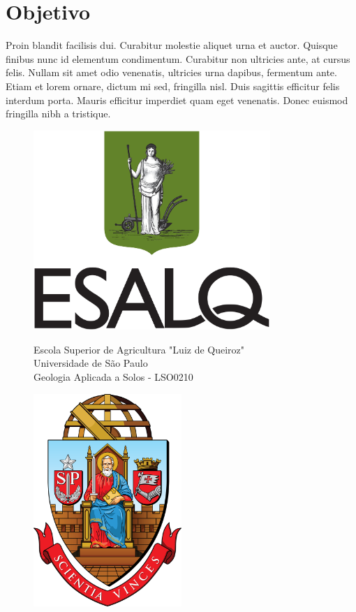\documentclass{article}
\begin{document}
	\section{Objetivo}
	
	
	Proin blandit facilisis dui. Curabitur molestie aliquet urna et auctor. Quisque finibus nunc id elementum condimentum. Curabitur non ultricies ante, at cursus felis. Nullam sit amet odio venenatis, ultricies urna dapibus, fermentum ante. Etiam et lorem ornare, dictum mi sed, fringilla nisl. Duis sagittis efficitur felis interdum porta. Mauris efficitur imperdiet quam eget venenatis. Donec euismod fringilla nibh a tristique.
	 
	 \begin{figure}[!ht]
	 	\centering
	 	
	 	\begin{minipage}{0.2\textwidth}
	 		\centering
	 		\includegraphics[width=0.8\textwidth]{Figuras/brasao_esalq1.jpg} 
	 	\end{minipage}\hfill
 		\begin{minipage}{0.5\textwidth}
 			\centering
 Escola Superior de Agricultura "Luiz de Queiroz"\\ 
 Universidade de São Paulo\\
 Geologia Aplicada a Solos - LSO0210\\
     	\end{minipage}\hfill
	 	\begin{minipage}{0.2\textwidth}
	 		\centering
	 		\includegraphics[width=0.5\textwidth]{Figuras/brasao_usp1.png}

\end{minipage}
\end{figure}
\end{document}
